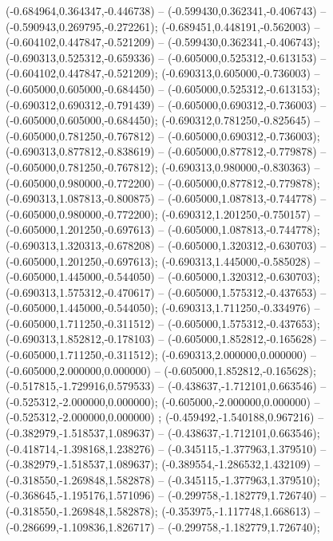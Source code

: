  (-0.684964,0.364347,-0.446738) -- (-0.599430,0.362341,-0.406743) -- (-0.590943,0.269795,-0.272261);
 (-0.689451,0.448191,-0.562003) -- (-0.604102,0.447847,-0.521209) -- (-0.599430,0.362341,-0.406743);
 (-0.690313,0.525312,-0.659336) -- (-0.605000,0.525312,-0.613153) -- (-0.604102,0.447847,-0.521209);
 (-0.690313,0.605000,-0.736003) -- (-0.605000,0.605000,-0.684450) -- (-0.605000,0.525312,-0.613153);
 (-0.690312,0.690312,-0.791439) -- (-0.605000,0.690312,-0.736003) -- (-0.605000,0.605000,-0.684450);
 (-0.690312,0.781250,-0.825645) -- (-0.605000,0.781250,-0.767812) -- (-0.605000,0.690312,-0.736003);
 (-0.690313,0.877812,-0.838619) -- (-0.605000,0.877812,-0.779878) -- (-0.605000,0.781250,-0.767812);
 (-0.690313,0.980000,-0.830363) -- (-0.605000,0.980000,-0.772200) -- (-0.605000,0.877812,-0.779878);
 (-0.690313,1.087813,-0.800875) -- (-0.605000,1.087813,-0.744778) -- (-0.605000,0.980000,-0.772200);
 (-0.690312,1.201250,-0.750157) -- (-0.605000,1.201250,-0.697613) -- (-0.605000,1.087813,-0.744778);
 (-0.690313,1.320313,-0.678208) -- (-0.605000,1.320312,-0.630703) -- (-0.605000,1.201250,-0.697613);
 (-0.690313,1.445000,-0.585028) -- (-0.605000,1.445000,-0.544050) -- (-0.605000,1.320312,-0.630703);
 (-0.690313,1.575312,-0.470617) -- (-0.605000,1.575312,-0.437653) -- (-0.605000,1.445000,-0.544050);
 (-0.690313,1.711250,-0.334976) -- (-0.605000,1.711250,-0.311512) -- (-0.605000,1.575312,-0.437653);
 (-0.690313,1.852812,-0.178103) -- (-0.605000,1.852812,-0.165628) -- (-0.605000,1.711250,-0.311512);
 (-0.690313,2.000000,0.000000) -- (-0.605000,2.000000,0.000000) -- (-0.605000,1.852812,-0.165628);
 (-0.517815,-1.729916,0.579533) -- (-0.438637,-1.712101,0.663546) -- (-0.525312,-2.000000,0.000000);
 (-0.605000,-2.000000,0.000000) -- (-0.525312,-2.000000,0.000000) ;
 (-0.459492,-1.540188,0.967216) -- (-0.382979,-1.518537,1.089637) -- (-0.438637,-1.712101,0.663546);
 (-0.418714,-1.398168,1.238276) -- (-0.345115,-1.377963,1.379510) -- (-0.382979,-1.518537,1.089637);
 (-0.389554,-1.286532,1.432109) -- (-0.318550,-1.269848,1.582878) -- (-0.345115,-1.377963,1.379510);
 (-0.368645,-1.195176,1.571096) -- (-0.299758,-1.182779,1.726740) -- (-0.318550,-1.269848,1.582878);
 (-0.353975,-1.117748,1.668613) -- (-0.286699,-1.109836,1.826717) -- (-0.299758,-1.182779,1.726740);
